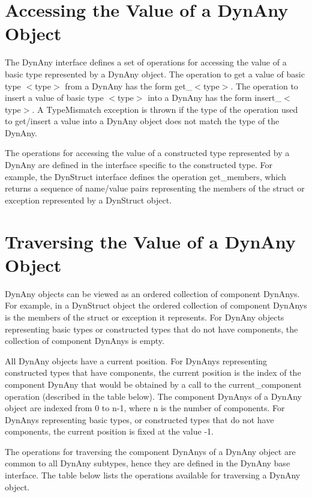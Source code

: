 \documentclass[12pt]{scrbook}
\begin{document}
\section{Accessing the Value of a DynAny Object}

The DynAny interface defines a set of operations for accessing the
value of a basic type represented by a DynAny object.  The operation
to get a value of basic type $<$type$>$ from a DynAny has the form
get\_$<$type$>$.  The operation to insert a value of basic type
$<$type$>$ into a DynAny has the form insert\_$<$type$>$.  A
TypeMismatch exception is thrown if the type of the operation used to
get/insert a value into a DynAny object does not match the type of
the DynAny.

The operations for accessing the value of a constructed type
represented by a DynAny are defined in the interface specific to the
constructed type.  For example, the DynStruct interface defines the
operation get\_members, which returns a sequence of name/value pairs
representing the members of the struct or exception represented by a
DynStruct object.

\section{Traversing the Value of a DynAny Object}

DynAny objects can be viewed as an ordered collection of component
DynAnys.  For example, in a DynStruct object the ordered collection
of component DynAnys is the members of the struct or exception it
represents.  For DynAny objects representing basic types or
constructed types that do not have components, the collection of
component DynAnys is empty.

All DynAny objects have a current position.  For DynAnys representing
constructed types that have components, the current position is the
index of the component DynAny that would be obtained by a call to the
current\_component operation (described in the table below).  The
component DynAnys of a DynAny object are indexed from 0 to n-1, where
n is the number of components.  For DynAnys representing basic types,
or constructed types that do not have components, the current
position is fixed at the value -1.

The operations for traversing the component DynAnys of a DynAny
object are common to all DynAny subtypes, hence they are defined in
the DynAny base interface.  The table below lists the operations
available for traversing a DynAny object.
\end{document}
